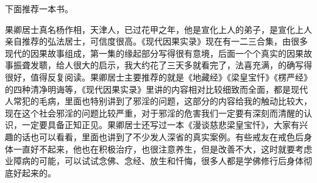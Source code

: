 下面推荐一本书。

\begin{book}
    果卿居士真名杨作相，天津人，已过花甲之年，他是宣化上人的弟子，是宣化上人亲自推荐的弘法居士，可信度很高。《现代因果实录》现在有一二三合集，由很多现代的因果故事组成，第一集的缘起部分写得很有意境，后面一个个真实的因果故事振聋发聩，给人很大的启示，我大约花了三天多就看完了，法喜充满，的确写得很好，值得反复阅读。果卿居士主要推荐的就是《地藏经》《梁皇宝忏》《楞严经》的四种清净明诲等，《现代因果实录》里讲的内容相对比较细致而全面，都是现代人常犯的毛病，里面也特别讲到了邪淫的问题，这部分的内容给我的触动比较大，现在这个社会邪淫的问题比较严重，对于邪淫的危害我们一定要有深刻而清醒的认识，一定要具备正知正见。果卿居士还写过一本《漫谈慈悲梁皇宝忏》，大家有兴趣的话也可以看看，里面也讲到了不少发人深省的真实案例。有些戒友在戒色后身体一直好不起来，他也在积极治疗，也很注意养生，但是改善不大，这时就要考虑业障病的可能，可以试试念佛、念经、放生和忏悔，很多人都是学佛修行后身体彻底好起来的。
\end{book}
